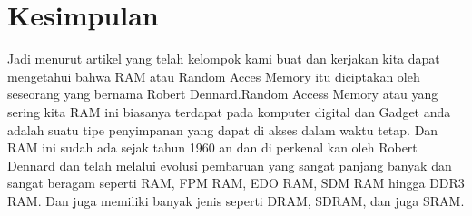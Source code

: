 \section{Kesimpulan}
Jadi menurut artikel yang telah kelompok kami buat dan kerjakan kita dapat mengetahui bahwa RAM atau Random Acces Memory itu diciptakan oleh seseorang yang bernama Robert Dennard.Random Access Memory atau yang sering kita RAM ini biasanya terdapat pada komputer digital dan Gadget anda adalah suatu tipe penyimpanan yang dapat di akses dalam waktu tetap. Dan RAM ini sudah ada sejak tahun 1960 an dan di perkenal kan oleh Robert Dennard dan telah melalui evolusi pembaruan yang sangat panjang banyak dan sangat beragam seperti RAM, FPM RAM, EDO RAM, SDM RAM hingga DDR3 RAM. Dan juga memiliki banyak jenis seperti DRAM, SDRAM, dan juga SRAM.